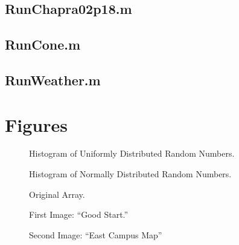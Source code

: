 \documentclass{article}
\begin{document}
\subsection{RunChapra02p18.m}
\clearpage
\subsection{RunCone.m}
\clearpage
\subsection{RunWeather.m}

\clearpage %

\section{Figures}

\begin{figure}[ht!]
\begin{center}
\caption{Histogram of Uniformly Distributed Random Numbers.}
\end{center}
\end{figure}

\begin{figure}[ht!]
\begin{center}
\caption{Histogram of Normally Distributed Random Numbers.}
\end{center}
\end{figure}

\begin{figure}[ht!]
\begin{center}
\caption{Original Array.}
\end{center}
\end{figure}

\begin{figure}[ht!]
\begin{center}
\caption{First Image: ``Good Start.''}
\end{center}
\end{figure}

\begin{figure}[ht!]
\begin{center}
\caption{Second Image: ``East Campus Map''}
\end{center}
\end{figure}
\end{document}
